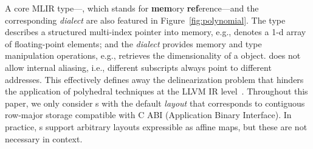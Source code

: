 A core MLIR type---\memref, which stands for \textbf{mem}ory \textbf{ref}erence---and the corresponding \emph{\memref dialect} are also featured in Figure~\ref{fig:polynomial}. The \memref type describes a structured multi-index pointer into memory, e.g.,  denotes a 1-d array of floating-point elements; and the \emph{\memref dialect} provides memory and type manipulation operations, e.g.,  retrieves the dimensionality of a \memref object.
\memref does not allow internal aliasing, i.e., different subscripts always point to different addresses.
This effectively defines away the delinearization problem that hinders the application of polyhedral techniques at the LLVM IR level~\cite{delinearization}.
Throughout this paper, we only consider {\memref}s with the default \emph{layout} that corresponds to contiguous row-major storage compatible with C ABI (Application Binary Interface). In practice, {\memref}s support arbitrary layouts expressible as affine maps, but these are not necessary in \tool context.



